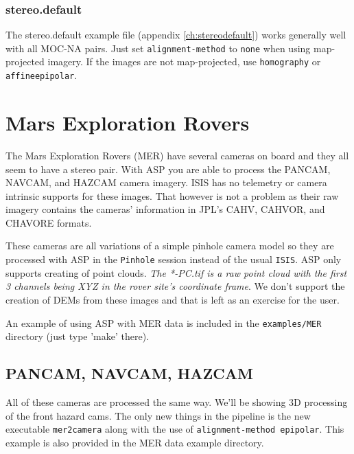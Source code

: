 \subsubsection*{stereo.default}

The stereo.default example file (appendix \ref{ch:stereodefault}) works
generally well with all MOC-NA pairs. Just set \texttt{alignment-method}
to \texttt{none} when using map-projected imagery. If the images are not
map-projected, use \texttt{homography} or \texttt{affineepipolar}.

\section{Mars Exploration Rovers}\label{mer:example}

The Mars Exploration Rovers (MER) have several cameras on board
and they all seem to have a stereo pair. With ASP you are able to
process the PANCAM, NAVCAM, and HAZCAM camera imagery. ISIS has no
telemetry or camera intrinsic supports for these images. That however is
not a problem as their raw imagery contains the cameras' information in
JPL's CAHV, CAHVOR, and CHAVORE formats.

These cameras are all variations of a simple pinhole camera model so
they are processed with ASP in the \texttt{Pinhole} session instead of
the usual \texttt{ISIS}. ASP only supports creating of point
clouds. \emph{The *-PC.tif is a raw point cloud with the first 3
  channels being XYZ in the rover site's coordinate frame}. We don't
support the creation of DEMs from these images and that is left as an
exercise for the user.

An example of using ASP with MER data is included in the
\texttt{examples/MER} directory (just type 'make' there).

\subsection{PANCAM, NAVCAM, HAZCAM}

All of these cameras are processed the same way. We'll be showing 3D
processing of the front hazard cams. The only new things in the
pipeline is the new executable \texttt{mer2camera} along with the use
of \texttt{alignment-method epipolar}. This example is also provided
in the MER data example directory.

